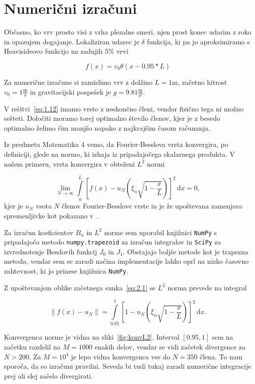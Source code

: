 \section{Numerični izračuni}

Občasno, ko vrv prosto visi z vrha plezalne smeri, njen prost konec udarim z roko in opazujem dogajanje. Lokaliziran udarec je \( \delta \) funkcija, ki pa jo aproksimiramo s Heavisideovo funkcijo na zadnjih \( 5\% \) vrvi

\begin{equation}
\label{eq:2.1}
 f(x) = v_0 \theta(x - 0.95 * L) 
\end{equation}

Za numerične izračune si zamislimo vrv z dolžino \( L = 1 \mathrm{m} \), začetno hitrost \( v_0 = 1 \frac{\mathrm{m}}{\mathrm{s}} \) in gravitacijski pospešek je \( g = 9.81 \frac{\mathrm{m}}{\mathrm{s} ^2} \).

V rešitvi~\eqref{eq:1.12} imamo vrsto z neskončno členi, vendar fizično tega ni možno sešteti. Določiti moramo torej optimalno število členov, kjer je z besedo optimalno želimo čim manjšo napako z najkrajšim časom računanja. 

Iz predmeta Matematika 4 vemo, da Fourier-Besslova vrsta konvergira, po definiciji, glede na normo, ki izhaja iz pripadajočega skalarnega produkta. V našem primeru, vrsta konvergira v obteženi \( L^2 \) normi

\[ \lim_{N \to \infty} \int\limits_0^L {\left[ f(x) - u_N \left( \xi_n \sqrt{1 - \frac{x}{L} } \right) \right]}^2 \, \mathrm{d} x = 0,
\]
kjer je \( u_N \) vsota \( N \) členov Fourier-Besslove vrste in je že upoštevana zamenjava spremenljivke kot pokazano v~\cite{dunaev_answer_2023}.

Za izračun koeficientov \( B_n \) in \( L^2 \) norme sem uporabil knjižnici \texttt{NumPy} s pripadajočo metodo \texttt{numpy.trapezoid} za izračun integralov in \texttt{SciPy} za izvrednotenje Besslovih funkcij \( J_0 \) in \( J_1 \). Obstajajo boljše metode kot je trapezna metoda, vendar sem se zaradi načina implementacije lahko oprl na nizko časovno zahtevnost, ki jo prinese knjižnica \texttt{NumPy}.

Z upoštevanjem oblike začetnega sunka~\eqref{eq:2.1} se \( L^2 \) norma prevede na integral

\[ \left\lVert f(x) - u_N \right\rVert = \int\limits_{0.95}^{1} {\left[ 1 - u_N \left( \xi_n \sqrt{1 - \frac{x}{L}} \right) \right]} ^2 \, \mathrm{d} x.
\]

Konvergenca norme je vidna na sliki~\ref{fig:konvL2}. Interval \( [0.95, 1] \) sem na začetku razdelil na \( M = 1000 \) enakih delov, vendar se vidi začetek divergence za \( N > 200 \). Za \( M = 10^4 \) je lepo vidna konvergenca vse do \( N = 350 \) člena. To nam sporoča, da so izračuni pravilni. Seveda bi tudi tukaj zaradi numerične integracije prej ali slej začelo divergirati.

